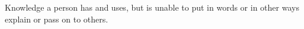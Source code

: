 \begin{definition} \label{def:tacit_knowledge} 
  Knowledge a person has and uses, but is unable to put in words or in other ways explain or pass on to others.
\end{definition}
